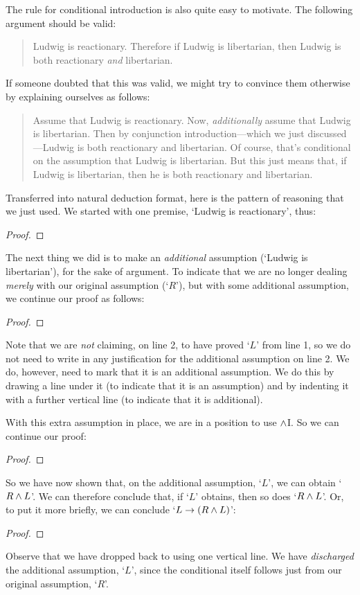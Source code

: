 The rule for conditional introduction is also quite easy to motivate. The following argument should be valid:
	\begin{quote}
		Ludwig is reactionary. Therefore if Ludwig is libertarian, then Ludwig is both reactionary \emph{and} libertarian.
	\end{quote}
If someone doubted that this was valid, we might try to convince them otherwise by explaining ourselves as follows:
	\begin{quote}
		Assume that Ludwig is reactionary. Now, \emph{additionally} assume that Ludwig is libertarian. Then by conjunction introduction---which we just discussed---Ludwig is both reactionary and libertarian. Of course, that's conditional on the assumption that Ludwig is libertarian. But this just means that, if Ludwig is libertarian, then he is both reactionary and libertarian.
	\end{quote}
Transferred into natural deduction format, here is the pattern of reasoning that we just used. We started with one premise, `Ludwig is reactionary', thus:
	\begin{proof}
	\end{proof}
The next thing we did is to make an \emph{additional} assumption (`Ludwig is libertarian'), for the sake of argument. To indicate that we are no longer dealing \emph{merely} with our original assumption (`$R$'), but with some additional assumption, we continue our proof as follows:
	\begin{proof}
		\open
	\end{proof}
Note that we are \emph{not} claiming, on line 2, to have proved `$L$' from line 1, so we do not need to write in any justification for the additional assumption on line 2. We do, however, need to mark that it is an additional assumption. We do this by drawing a line under it (to indicate that it is an assumption) and by indenting it with a further vertical line (to indicate that it is additional). 

With this extra assumption in place, we are in a position to use $\wedge$I. So we can continue our proof:
	\begin{proof}
		\open
	\end{proof}
So we have now shown that, on the additional assumption, `$L$', we can obtain `$R \wedge L$'. We can therefore conclude that, if `$L$' obtains, then so does `$R \wedge L$'. Or, to put it more briefly, we can conclude `$L \rightarrow (R \wedge L)$':
	\begin{proof}
		\open
			\close
	\end{proof}
Observe that we have dropped back to using one vertical line.  We have \emph{discharged} the additional assumption, `$L$', since the conditional itself follows just from our original assumption, `$R$'.


